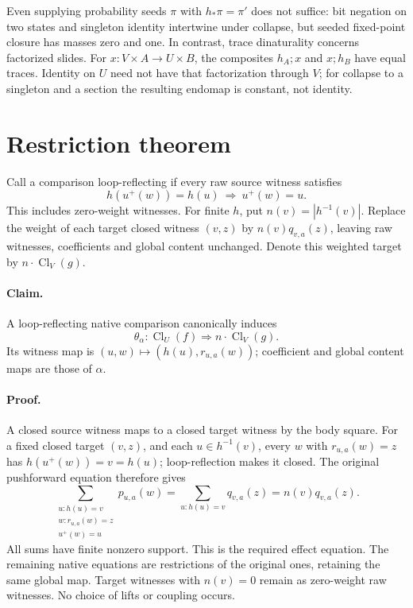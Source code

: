 \documentclass{article}
\begin{document}
Even supplying probability seeds $\pi$ with $h_*\pi=\pi'$ does not suffice: bit negation on two states and singleton identity intertwine under collapse, but seeded fixed-point closure has masses zero and one. In contrast, trace dinaturality concerns factorized slides. For $x:V\times A\to U\times B$, the composites $h_A;x$ and $x;h_B$ have equal traces. Identity on $U$ need not have that factorization through $V$; for collapse to a singleton and a section the resulting endomap is constant, not identity.
\section{Restriction theorem}
Call a comparison loop-reflecting if every raw source witness satisfies
\[h(u^+(w))=h(u)\ \Longrightarrow\ u^+(w)=u.\]
This includes zero-weight witnesses. For finite $h$, put $n(v)=|h^{-1}(v)|$. Replace the weight of each target closed witness $(v,z)$ by $n(v)q_{v,a}(z)$, leaving raw witnesses, coefficients and global content unchanged. Denote this weighted target by $n\cdot\operatorname{Cl}_V(g)$.

\paragraph{Claim.} A loop-reflecting native comparison canonically induces
\[\theta_\alpha:\operatorname{Cl}_U(f)\Longrightarrow n\cdot\operatorname{Cl}_V(g).\]
Its witness map is $(u,w)\mapsto(h(u),r_{u,a}(w))$; coefficient and global content maps are those of $\alpha$.

\paragraph{Proof.} A closed source witness maps to a closed target witness by the body square. For a fixed closed target $(v,z)$, and each $u\in h^{-1}(v)$, every $w$ with $r_{u,a}(w)=z$ has $h(u^+(w))=v=h(u)$; loop-reflection makes it closed. The original pushforward equation therefore gives
\[
 \sum_{\substack{u:h(u)=v\\w:r_{u,a}(w)=z\\u^+(w)=u}}p_{u,a}(w)
 =\sum_{u:h(u)=v}q_{v,a}(z)=n(v)q_{v,a}(z).
\]
All sums have finite nonzero support. This is the required effect equation. The remaining native equations are restrictions of the original ones, retaining the same global map. Target witnesses with $n(v)=0$ remain as zero-weight raw witnesses. No choice of lifts or coupling occurs.
\end{document}
